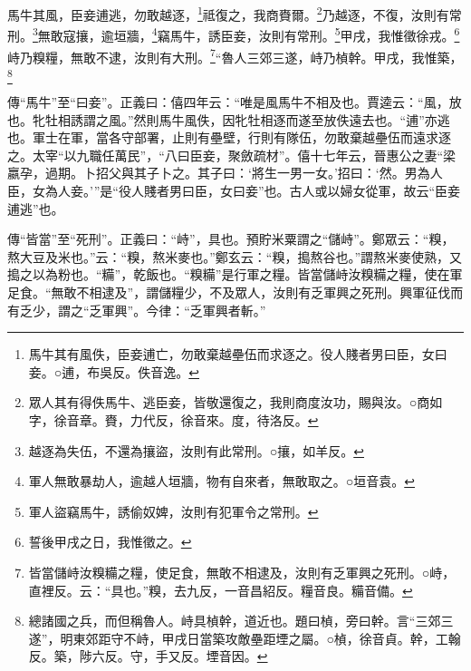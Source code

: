 馬牛其風，臣妾逋逃，勿敢越逐，\footnote{馬牛其有風佚，臣妾逋亡，勿敢棄越壘伍而求逐之。役人賤者男曰臣，女曰妾。○逋，布吳反。佚音逸。}祗復之，我商賚爾。\footnote{眾人其有得佚馬牛、逃臣妾，皆敬還復之，我則商度汝功，賜與汝。○商如字，徐音章。賚，力代反，徐音來。度，待洛反。}乃越逐，不復，汝則有常刑。\footnote{越逐為失伍，不還為攘盜，汝則有此常刑。○攘，如羊反。}無敢寇攘，逾垣牆，\footnote{軍人無敢暴劫人，逾越人垣牆，物有自來者，無敢取之。○垣音袁。}竊馬牛，誘臣妾，汝則有常刑。\footnote{軍人盜竊馬牛，誘偷奴婢，汝則有犯軍令之常刑。}甲戌，我惟徵徐戎。\footnote{誓後甲戌之日，我惟徵之。}峙乃糗糧，無敢不逮，汝則有大刑。\footnote{皆當儲峙汝糗糒之糧，使足食，無敢不相逮及，汝則有乏軍興之死刑。○峙，直裡反。云：“具也。”糗，去九反，一音昌紹反。糧音良。糒音備。}“魯人三郊三遂，峙乃楨幹。甲戌，我惟築，\footnote{總諸國之兵，而但稱魯人。峙具楨幹，道近也。題曰楨，旁曰幹。言“三郊三遂”，明東郊距守不峙，甲戌日當築攻敵壘距堙之屬。○楨，徐音貞。幹，工翰反。築，陟六反。守，手又反。堙音因。}


{\noindent\zhuan{}\fzbyks 傳“馬牛”至“曰妾”。正義曰：僖四年云：“唯是風馬牛不相及也。賈逵云：“風，放也。牝牡相誘謂之風。”然則馬牛風佚，因牝牡相逐而遂至放佚遠去也。“逋”亦逃也。軍士在軍，當各守部署，止則有壘壁，行則有隊伍，勿敢棄越壘伍而遠求逐之。太宰“以九職任萬民”，“八曰臣妾，聚斂疏材”。僖十七年云，晉惠公之妻“梁嬴孕，過期。卜招父與其子卜之。其子曰：‘將生一男一女。’招曰：‘然。男為人臣，女為人妾。’”是“役人賤者男曰臣，女曰妾”也。古人或以婦女從軍，故云“臣妾逋逃”也。 \par}

{\noindent\zhuan{}\fzbyks 傳“皆當”至“死刑”。正義曰：“峙”，具也。預貯米粟謂之“儲峙”。鄭眾云：“糗，熬大豆及米也。”云：“糗，熬米麥也。”鄭玄云：“糗，搗熬谷也。”謂熬米麥使熟，又搗之以為粉也。“糒”，乾飯也。“糗糒”是行軍之糧。皆當儲峙汝糗糒之糧，使在軍足食。“無敢不相逮及”，謂儲糧少，不及眾人，汝則有乏軍興之死刑。興軍征伐而有乏少，謂之“乏軍興”。今律：“乏軍興者斬。” \par}

